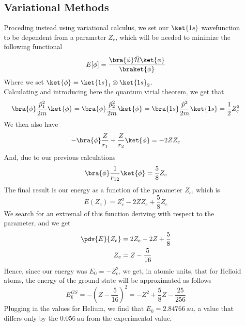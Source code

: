 \documentclass[a4paper, 11pt]{book}
\newcommand{\1}{\opr{\mathds{1}}}
\newcommand{\ham}{\mathcal{H}}
\newcommand{\opr}[1]{\hat{#1}}
\theoremstyle{plain}
\begin{document}
	\subsection{Variational Methods}
	Proceding instead using variational calculus, we set our $\ket{1s}$ wavefunction to be dependent from a parameter $Z_e$, which will be needed to minimize the following functional
	\begin{equation}
		E[\phi]=\frac{\bra{\phi}\opr{\ham}\ket{\phi}}{\braket{\phi}}
		\label{eq:phiwavefunction}
	\end{equation}
	Where we set $\ket{\phi}=\ket{1s}_1\otimes\ket{1s}_2$.\\
	Calculating and introducing here the quantum virial theorem, we get that
	\begin{equation}
		\bra{\phi}\frac{\opr{p}^2_1}{2m}\ket{\phi}=\bra{\phi}\frac{\opr{p}^2_2}{2m}\ket{\phi}=\bra{1s}\frac{\opr{p}^2}{2m}\ket{1s}=\frac{1}{2}Z_e^2
		\label{eq:expectedvalueheliumelectrons}
	\end{equation}
	We then also have
	\begin{equation}
		-\bra{\phi}\frac{Z}{r_1}+\frac{Z}{r_2}\ket{\phi}=-2ZZ_e
		\label{eq:potentialexpval}
	\end{equation}
	And, due to our previous calculations
	\begin{equation}
		\bra{\phi}\frac{1}{r_{12}}\ket{\phi}=\frac{5}{8}Z_e
		\label{eq:r12expval}
	\end{equation}
	The final result is our energy as a function of the parameter $Z_e$, which is
	\begin{equation}
		E(Z_e)=Z_e^2-2ZZ_e+\frac{5}{8}Z_e
		\label{eq:heliumenergyparameter}
	\end{equation}
	We search for an extremal of this function deriving with respect to the parameter, and we get
	\begin{equation}
		\begin{aligned}
			\pdv{E}{Z_e}&=2Z_e-2Z+\frac{5}{8}\\
			Z_e&=Z-\frac{5}{16}
		\end{aligned}
		\label{eq:parametervalue}
	\end{equation}
	Hence, since our energy was $E_0=-Z_e^2$, we get, in atomic units, that for Helioid atoms, the energy of the ground state will be approximated as follows
	\begin{equation}
		E_0^{GS}=-\left( Z-\frac{5}{16} \right)^2=-Z^2+\frac{5}{8}Z-\frac{25}{256}
		\label{eq:heliumgsfinal}
	\end{equation}
	Plugging in the values for Helium, we find that $E_0=2.84766\ \mathrm{au}$, a value that differs only by the $0.056\ \mathrm{au}$ from the experimental value.\\
\end{document}
